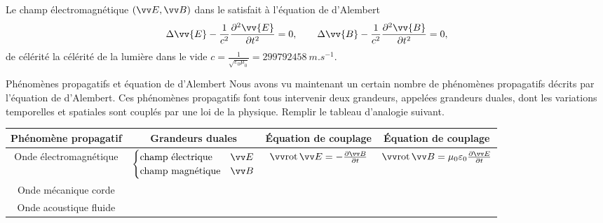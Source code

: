 \documentclass[12pt,fancy]{cours}
\begin{document}

\begin{theorem}\label{prop:}
Le champ électromagnétique $(\E,\B)$ dans le  satisfait à l'équation de d'Alembert
$$
\Delta\vv{E}- \frac{1}{c^2} \frac{\partial^2\vv{E}}{\partial t^2}=0, \qquad \Delta\vv{B}-\frac{1}{c^2} \frac{\partial^2\vv{B}}{\partial t^2}=0,
$$
de célérité la célérité de la lumière dans le vide $c=\frac{1}{\sqrt{\varepsilon_0\mu_0}} = \SI{299792458}{m.s^{-1}}$.
\end{theorem}

\begin{exemple}{Phénomènes propagatifs et équation de d'Alembert}
  Nous avons vu maintenant un certain nombre de phénomènes propagatifs décrits par l'équation de d'Alembert. Ces phénomènes propagatifs font tous intervenir deux grandeurs, appelées grandeurs duales, dont les variations temporelles et spatiales sont couplés par une loi de la physique. Remplir le tableau d'analogie suivant.
\begin{center}
  \begin{tabular}{|c|c|c|c|}
    \hline
    Phénomène propagatif & Grandeurs duales & Équation de couplage & Équation de couplage \\
    \hline
    Onde électromagnétique & $\begin{cases} \text{champ électrique} & \E \\ \text{champ magnétique} & \B \end{cases}$ & $\rot{\E}=-\dr{\B}{t}$ & $\rot{\B}=\mu_0\epz\dr{\E}{t}$ \\
    \hline
    Onde mécanique corde & & &  \\[1cm]
    \hline
    Onde acoustique fluide &  &  &  \\[1cm]
    \hline
    
  \end{tabular}
\end{center}

\end{exemple}
\end{document}
